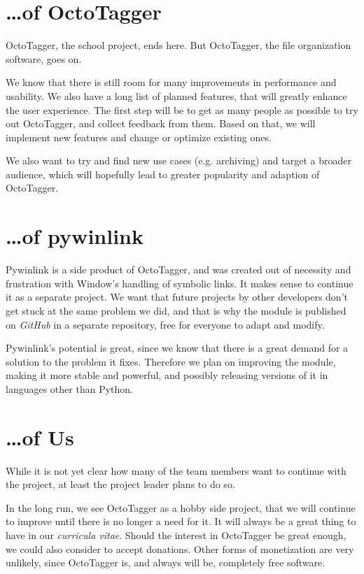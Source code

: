 \section{\ldots{}of OctoTagger}
\def \kapitelautor {Erik Ritschl}

OctoTagger, the school project, ends here. But OctoTagger, the file
organization software, goes on.

We know that there is still room for many improvements in performance and
usability. We also have a long list of planned features, that will greatly
enhance the user experience. The first step will be to get as many people as
possible to try out OctoTagger, and collect feedback from them. Based on that,
we will implement new features and change or optimize existing ones.

We also want to try and find new use cases (e.g. archiving) and target a
broader audience, which will hopefully lead to greater popularity and adaption
of OctoTagger.

\section{\ldots{}of pywinlink}
\def \kapitelautor {Erik Ritschl}

Pywinlink is a side product of OctoTagger, and was created out of necessity and
frustration with Window's handling of symbolic links. It makes sense to
continue it as a separate project. We want that future projects by other
developers don't get stuck at the same problem we did, and that is why the
module is published on \textit{GitHub} in a separate repository, free for
everyone to adapt and modify.

Pywinlink's potential is great, since we know that there is a great demand for
a solution to the problem it fixes. Therefore we plan on improving the module,
making it more stable and powerful, and possibly releasing versions of it in
languages other than Python.

\section{\ldots{}of Us}
\def \kapitelautor {Erik Ritschl}

While it is not yet clear how many of the team members want to continue with
the project, at least the project leader plans to do so.

In the long run, we see OctoTagger as a hobby side project, that we will
continue to improve until there is no longer a need for it. It will always be a
great thing to have in our \textit{curricula vitae}. Should the interest in
OctoTagger be great enough, we could also consider to accept donations. Other
forms of monetization are very unlikely, since OctoTagger is, and always will
be, completely free software.
